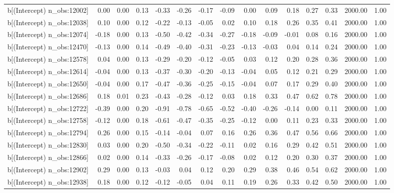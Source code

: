 \begin{table}[ht]
\begin{tabular}{rrrrrrrrrrrrrrr}
  b[(Intercept) n\_obs:12002] & 0.00 & 0.00 & 0.13 & -0.33 & -0.26 & -0.17 & -0.09 & 0.00 & 0.09 & 0.18 & 0.27 & 0.33 & 2000.00 & 1.00 \\ 
  b[(Intercept) n\_obs:12038] & 0.10 & 0.00 & 0.12 & -0.22 & -0.13 & -0.05 & 0.02 & 0.10 & 0.18 & 0.26 & 0.35 & 0.41 & 2000.00 & 1.00 \\ 
  b[(Intercept) n\_obs:12074] & -0.18 & 0.00 & 0.13 & -0.50 & -0.42 & -0.34 & -0.27 & -0.18 & -0.09 & -0.01 & 0.08 & 0.16 & 2000.00 & 1.00 \\ 
  b[(Intercept) n\_obs:12470] & -0.13 & 0.00 & 0.14 & -0.49 & -0.40 & -0.31 & -0.23 & -0.13 & -0.03 & 0.04 & 0.14 & 0.24 & 2000.00 & 1.00 \\ 
  b[(Intercept) n\_obs:12578] & 0.04 & 0.00 & 0.13 & -0.29 & -0.20 & -0.12 & -0.05 & 0.03 & 0.12 & 0.20 & 0.28 & 0.36 & 2000.00 & 1.00 \\ 
  b[(Intercept) n\_obs:12614] & -0.04 & 0.00 & 0.13 & -0.37 & -0.30 & -0.20 & -0.13 & -0.04 & 0.05 & 0.12 & 0.21 & 0.29 & 2000.00 & 1.00 \\ 
  b[(Intercept) n\_obs:12650] & -0.04 & 0.00 & 0.17 & -0.47 & -0.36 & -0.25 & -0.15 & -0.04 & 0.07 & 0.17 & 0.29 & 0.40 & 2000.00 & 1.00 \\ 
  b[(Intercept) n\_obs:12686] & 0.18 & 0.01 & 0.23 & -0.43 & -0.28 & -0.12 & 0.03 & 0.18 & 0.33 & 0.47 & 0.62 & 0.78 & 2000.00 & 1.00 \\ 
  b[(Intercept) n\_obs:12722] & -0.39 & 0.00 & 0.20 & -0.91 & -0.78 & -0.65 & -0.52 & -0.40 & -0.26 & -0.14 & 0.00 & 0.11 & 2000.00 & 1.00 \\ 
  b[(Intercept) n\_obs:12758] & -0.12 & 0.00 & 0.18 & -0.61 & -0.47 & -0.35 & -0.25 & -0.12 & 0.00 & 0.11 & 0.23 & 0.33 & 2000.00 & 1.00 \\ 
  b[(Intercept) n\_obs:12794] & 0.26 & 0.00 & 0.15 & -0.14 & -0.04 & 0.07 & 0.16 & 0.26 & 0.36 & 0.47 & 0.56 & 0.66 & 2000.00 & 1.00 \\ 
  b[(Intercept) n\_obs:12830] & 0.03 & 0.00 & 0.20 & -0.50 & -0.34 & -0.22 & -0.11 & 0.02 & 0.16 & 0.29 & 0.42 & 0.51 & 2000.00 & 1.00 \\ 
  b[(Intercept) n\_obs:12866] & 0.02 & 0.00 & 0.14 & -0.33 & -0.26 & -0.17 & -0.08 & 0.02 & 0.12 & 0.20 & 0.30 & 0.37 & 2000.00 & 1.00 \\ 
  b[(Intercept) n\_obs:12902] & 0.29 & 0.00 & 0.13 & -0.03 & 0.04 & 0.12 & 0.20 & 0.29 & 0.38 & 0.46 & 0.54 & 0.62 & 2000.00 & 1.00 \\ 
  b[(Intercept) n\_obs:12938] & 0.18 & 0.00 & 0.12 & -0.12 & -0.05 & 0.04 & 0.11 & 0.19 & 0.26 & 0.33 & 0.42 & 0.50 & 2000.00 & 1.00 \\ 

\end{tabular}
\end{table}
